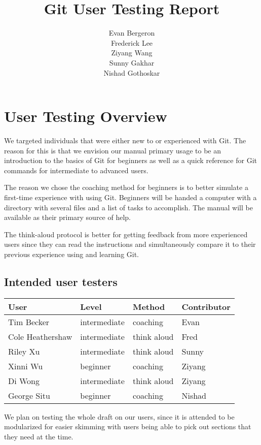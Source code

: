 \documentclass[11pt]{article}
\title{Git User Testing Report}
\author{Evan Bergeron\\
Frederick Lee\\
Ziyang Wang\\
Sunny Gakhar\\
Nishad Gothoskar}
\begin{document}
\maketitle

\section*{User Testing Overview}

We targeted individuals that were either new to or experienced with Git.  The reason for this is that we envision our manual primary usage to be an introduction to the basics of Git for beginners as well as a quick reference for Git commands for intermediate to advanced users.

The reason we chose the coaching method for beginners is to better simulate a first-time experience with using Git.  Beginners will be handed a computer with a directory with several files and a list of tasks to accomplish.  The manual will be available as their primary source of help.

The think-aloud protocol is better for getting feedback from more experienced users since they can read the instructions and simultaneously compare it to their previous experience using and learning Git.

\subsection*{Intended user testers}

\begin{center}
\begin{tabular}{llll}
User & Level & Method & Contributor\\
\hline
Tim Becker & intermediate & coaching & Evan\\
Cole Heathershaw & intermediate & think aloud & Fred\\
Riley Xu & intermediate & think aloud & Sunny\\
Xinni Wu & beginner & coaching & Ziyang\\
Di Wong & intermediate & think aloud & Ziyang\\
George Situ & beginner & coaching & Nishad\\
\end{tabular}
\end{center}

We plan on testing the whole draft on our users, since it is attended to be modularized for easier skimming with users being able to pick out sections that they need at the time.
\end{document}
